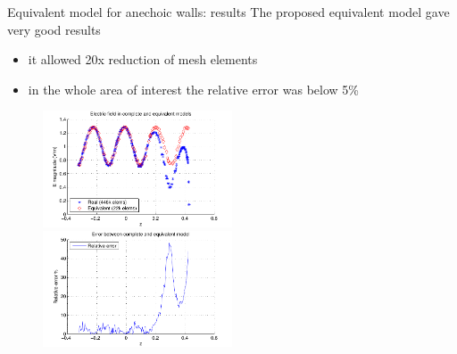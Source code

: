 \documentclass{beamer}
\begin{document}
\begin{frame}{Equivalent model for anechoic walls: results}
    The proposed equivalent model gave very good results
    \begin{itemize}
        \item it allowed 20x reduction of mesh elements
        \item in the whole area of interest the relative error was below 5\%
    \end{itemize}

    \begin{figure}
        \includegraphics[width=0.5\textwidth]{img/efield_cmp_2.pdf}
        \includegraphics[width=0.5\textwidth]{img/error_2.pdf}
    \end{figure}
    
\end{frame}
\end{document}
